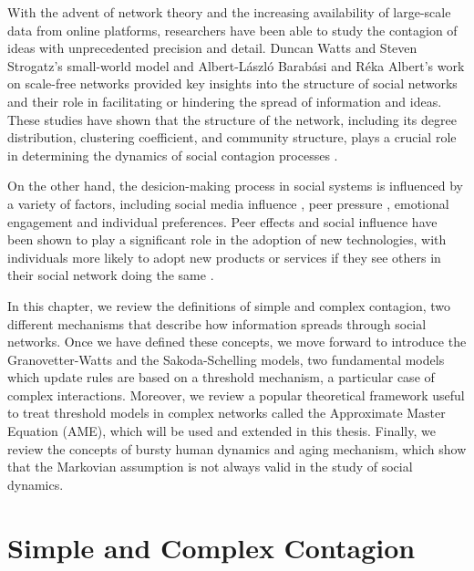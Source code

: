 With the advent of network theory and the increasing availability of large-scale data from online platforms, researchers have been able to study the contagion of ideas with unprecedented precision and detail. Duncan Watts and Steven Strogatz's small-world model \cite{watts1998collective} and Albert-László Barabási and Réka Albert's work on scale-free networks \cite{barabasi2009scale} provided key insights into the structure of social networks and their role in facilitating or hindering the spread of information and ideas. These studies have shown that the structure of the network, including its degree distribution, clustering coefficient, and community structure, plays a crucial role in determining the dynamics of social contagion processes \cite{newman2002spread, pastor-satorras-2015}.

On the other hand, the desicion-making process in social systems is influenced by a variety of factors, including social media influence \cite{online-platforms, jstor}, peer pressure \cite{jensen-2015}, emotional engagement \cite{ferrara-2015, steinert-2022} and individual preferences. Peer effects and social influence have been shown to play a significant role in the adoption of new technologies, with individuals more likely to adopt new products or services if they see others in their social network doing the same \cite{rogers2014, valente-1996, bollinger-2012}.

In this chapter, we review the definitions of simple and complex contagion, two different mechanisms that describe how information spreads through social networks. Once we have defined these concepts, we move forward to introduce the Granovetter-Watts and the Sakoda-Schelling models, two fundamental models which update rules are based on a threshold mechanism, a particular case of complex interactions. Moreover, we review a popular theoretical framework useful to treat threshold models in complex networks called the Approximate Master Equation (AME), which will be used and extended in this thesis. Finally, we review the concepts of bursty human dynamics and aging mechanism, which show that the Markovian assumption is not always valid in the study of social dynamics.

\section{\label{sec:Simple and Complex Contagion} Simple and Complex Contagion}

